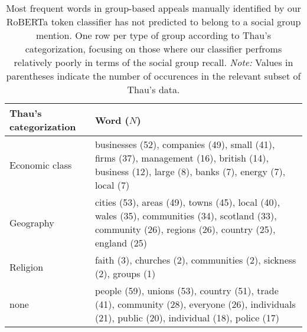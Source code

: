 \begin{table}[!h]

\caption{\label{tab:uk-manifestos_roberta_missed_thau-spans_wordfreqs}Most frequent words in group-based appeals manually identified by \citet{thau_how_2019} our RoBERTa token classifier has not predicted to belong to a social group mention. One row per type of group according to Thau's categorization, focusing on those where our classifier perfroms relatively poorly in terms of the social group recall. \emph{Note:} Values in parentheses indicate the number of occurences in the relevant subset of Thau's data.}
\centering
\fontsize{10}{12}\selectfont
\begin{tabular}[t]{l>{\raggedright\arraybackslash}p{4in}}
\toprule
Thau's categorization & Word ($N$)\\
\midrule
Economic class & businesses (52), companies (49), small (41), firms (37), management (16), british (14), business (12), large (8), banks (7), energy (7), local (7)\\
Geography & cities (53), areas (49), towns (45), local (40), wales (35), communities (34), scotland (33), community (26), regions (26), country (25), england (25)\\
Religion & faith (3), churches (2), communities (2), sickness (2), groups (1)\\
none & people (59), unions (53), country (51), trade (41), community (28), everyone (26), individuals (21), public (20), individual (18), police (17)\\
\bottomrule
\end{tabular}
\end{table}
